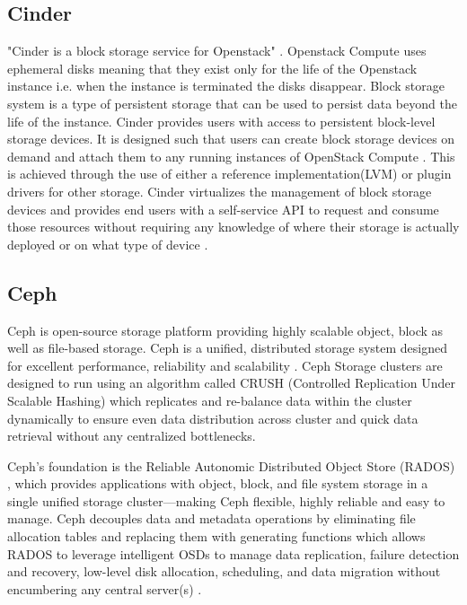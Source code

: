     
\subsection{ Cinder}
      
     "Cinder is a block storage service for Openstack"
     \cite{wiki-Cinder}. Openstack Compute uses ephemeral disks
     meaning that they exist only for the life of the Openstack
     instance i.e. when the instance is terminated the disks
     disappear. Block storage system is a type of persistent storage
     that can be used to persist data beyond the life of the
     instance. Cinder provides users with access to persistent
     block-level storage devices. It is designed such that users can
     create block storage devices on demand and attach them to any
     running instances of OpenStack Compute \cite{book-Cinder}. This
     is achieved through the use of either a reference
     implementation(LVM) or plugin drivers for other storage. Cinder
     virtualizes the management of block storage devices and provides
     end users with a self-service API to request and consume those
     resources without requiring any knowledge of where their storage
     is actually deployed or on what type of device
     \cite{wiki-Cinder}.
     
\subsection{ Ceph}

     Ceph is open-source storage platform providing highly scalable
     object, block as well as file-based storage. Ceph is a unified,
     distributed storage system designed for excellent performance,
     reliability and scalability \cite{www-ceph}. Ceph Storage
     clusters are designed to run using an algorithm called CRUSH
     (Controlled Replication Under Scalable Hashing) which replicates
     and re-balance data within the cluster dynamically to ensure even
     data distribution across cluster and quick data retrieval without
     any centralized bottlenecks.
 
     Ceph’s foundation is the Reliable Autonomic Distributed Object
     Store (RADOS) \cite{www-cepharch}, which provides applications
     with object, block, and file system storage in a single unified
     storage cluster—making Ceph flexible, highly reliable and easy to
     manage. Ceph decouples data and metadata operations by
     eliminating file allocation tables and replacing them with
     generating functions which allows RADOS to leverage intelligent
     OSDs to manage data replication, failure detection and recovery,
     low-level disk allocation, scheduling, and data migration without
     encumbering any central server(s) \cite{paper-Ceph}.
 
